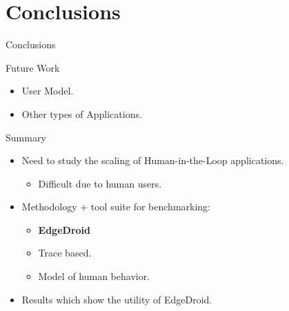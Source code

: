 \documentclass[aspectratio=1610, notes]{beamer}
\begin{document}
\section{Conclusions}
\begin{frame}{Conclusions}
    \begin{block}{Future Work}
        \begin{itemize}
            \item User Model.
            \item Other types of Applications.
        \end{itemize}
    \end{block}

    \begin{block}{Summary}
        \begin{itemize}
            \item Need to study the scaling of Human-in-the-Loop applications.
                  \begin{itemize}
                      \item Difficult due to human users.
                  \end{itemize}
            \item Methodology + tool suite for benchmarking:
                  \begin{itemize}
                      \item \textbf{EdgeDroid}
                      \item Trace based.
                      \item Model of human behavior.
                  \end{itemize}
            \item Results which show the utility of EdgeDroid.
        \end{itemize}
    \end{block}
\end{frame}
\end{document}
